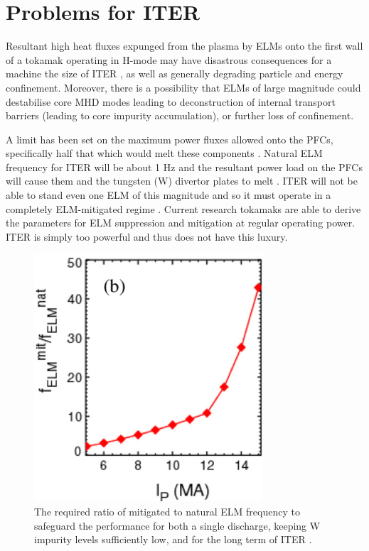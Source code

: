 \documentclass[11pt, twocolumn]{article}  %
\begin{document}
\section{Problems for ITER}\label{sec:Problems}
Resultant high heat fluxes expunged from the plasma by ELMs onto the first wall of a tokamak operating in H-mode may have disastrous consequences for a machine the size of ITER \cite{Connor2008}, as well as generally degrading particle and energy confinement. Moreover, there is a possibility that ELMs of large magnitude could destabilise core MHD modes leading to deconstruction of internal transport barriers \cite{Connor2004} (leading to core impurity accumulation), or further loss of confinement. 

A limit has been set on the maximum power fluxes allowed onto the PFCs, specifically half that which would melt these components \cite{Loarte2014a}. Natural ELM frequency for ITER will be about 1 Hz and the resultant power load on the PFCs will cause them and the tungsten (W) divertor plates to melt \cite{Federici2003}. ITER will not be able to stand even one ELM of this magnitude and so it must operate in a completely ELM-mitigated regime \cite{KirkFF}. Current research tokamaks are able to derive the parameters for ELM suppression and mitigation at regular operating power. ITER is simply too powerful and thus does not have this luxury.

\begin{figure}
\includegraphics[scale=0.6]{Figures/FreqEnhance.PNG}
\centering
\caption{The required ratio of mitigated to natural ELM frequency to safeguard the performance for both a single discharge, keeping W impurity levels sufficiently low, and for the long term of ITER \cite{Kirk2013}.}\label{fig:FreqEnhance}
\end{figure}
\end{document}
